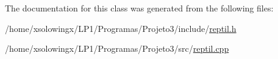 The documentation for this class was generated from the following files\+:\begin{DoxyCompactItemize}
\item 
/home/xsolowingx/\+L\+P1/\+Programas/\+Projeto3/include/\hyperlink{reptil_8h}{reptil.\+h}\item 
/home/xsolowingx/\+L\+P1/\+Programas/\+Projeto3/src/\hyperlink{reptil_8cpp}{reptil.\+cpp}\end{DoxyCompactItemize}
